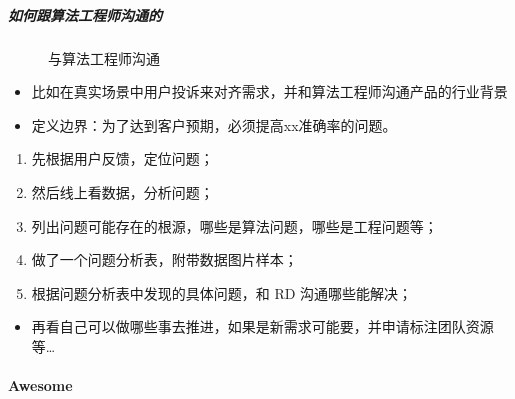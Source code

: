 \documentclass[letterpaper,11pt,english]{sphinxmanual}
\begin{document}
\subparagraph{如何跟算法工程师沟通的}
\label{\detokenize{chapter_introduction/AI_PM:id34}}
\begin{figure}[H]
\centering
\capstart

\noindent{}
\caption{与算法工程师沟通\sphinxfootnotemark[258]}\label{\detokenize{chapter_introduction/AI_PM:id65}}\end{figure}
%
\begin{footnotetext}[258]\sphinxAtStartFootnote
{}
%
\end{footnotetext}\ignorespaces \begin{itemize}
\item {} 
比如在真实场景中用户投诉来对齐需求，并和算法工程师沟通产品的行业背景

\item {} 
定义边界：为了达到客户预期，必须提高xx准确率的问题。

\end{itemize}
\begin{enumerate}
%
\item {} 
先根据用户反馈，定位问题；

\item {} 
然后线上看数据，分析问题；

\item {} 
列出问题可能存在的根源，哪些是算法问题，哪些是工程问题等；

\item {} 
做了一个问题分析表，附带数据图片样本；

\item {} 
根据问题分析表中发现的具体问题，和 RD 沟通哪些能解决；

\end{enumerate}
\begin{itemize}
\item {} 
再看自己可以做哪些事去推进，如果是新需求可能要，并申请标注团队资源等…

\end{itemize}


\paragraph{Awesome}
\label{\detokenize{chapter_introduction/AI_PM:awesome}}
\end{document}

